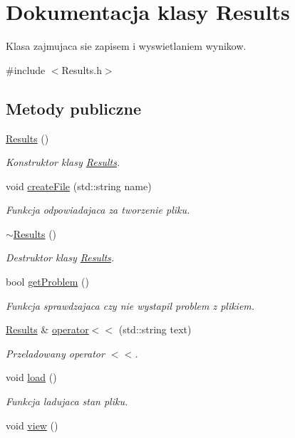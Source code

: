 \hypertarget{class_results}{}\section{Dokumentacja klasy Results}
\label{class_results}


Klasa zajmujaca sie zapisem i wyswietlaniem wynikow.  




{\ttfamily \#include $<$Results.\+h$>$}

\subsection*{Metody publiczne}
\begin{DoxyCompactItemize}
\item 
\hyperlink{class_results_ae15a9e843b67c54e98a6f59a56104e1f}{Results} ()
\begin{DoxyCompactList}\small\item\em Konstruktor klasy \hyperlink{class_results}{Results}. \end{DoxyCompactList}\item 
void \hyperlink{class_results_a524b63b8928aa4a85fb29b89197b4134}{create\+File} (std\+::string name)
\begin{DoxyCompactList}\small\item\em Funkcja odpowiadajaca za tworzenie pliku. \end{DoxyCompactList}\item 
\hyperlink{class_results_a0547c32c2061192a72cad9db694ffb16}{$\sim$\+Results} ()
\begin{DoxyCompactList}\small\item\em Destruktor klasy \hyperlink{class_results}{Results}. \end{DoxyCompactList}\item 
bool \hyperlink{class_results_a263e6cd51ac69ad6705c0f79f9179b63}{get\+Problem} ()
\begin{DoxyCompactList}\small\item\em Funkcja sprawdzajaca czy nie wystapil problem z plikiem. \end{DoxyCompactList}\item 
\hyperlink{class_results}{Results} \& \hyperlink{class_results_a069effb369c067ea8a8e2b5b0a647e72}{operator$<$$<$} (std\+::string text)
\begin{DoxyCompactList}\small\item\em Przeladowany operator $<$$<$. \end{DoxyCompactList}\item 
void \hyperlink{class_results_ab6d8f1711b2d9a611df1f5c460bd454a}{load} ()
\begin{DoxyCompactList}\small\item\em Funkcja ladujaca stan pliku. \end{DoxyCompactList}\item 
\hypertarget{class_results_a546671884adf0df06f778cdb9752b453}{}void \hyperlink{class_results_a546671884adf0df06f778cdb9752b453}{view} ()\label{class_results_a546671884adf0df06f778cdb9752b453}


\end{DoxyCompactItemize}
